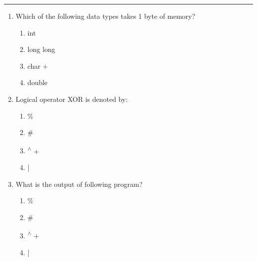 \documentclass[11pt]{article}
\begin{document}
\medskip\hrule
\begin{enumerate}

\item Which of the following data types takes 1 byte of memory?
\begin{enumerate}
    \item int
    \item long long
    \item char +
    \item double
\end{enumerate}

\item Logical operator XOR is denoted by:
\begin{enumerate}
    \item \%
    \item \#
    \item \textsuperscript{$\wedge$} +
    \item |
\end{enumerate}

\item What is the output of following program?
\begin{enumerate}
    \item \%
    \item \#
    \item \textsuperscript{$\wedge$} +
    \item |
\end{enumerate}


\end{enumerate}
\end{document}
